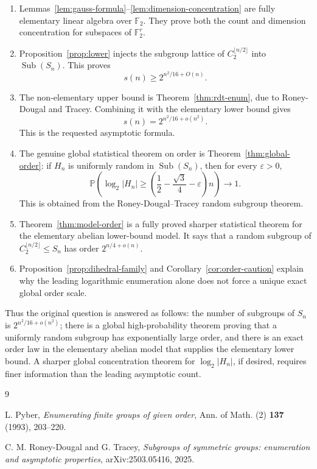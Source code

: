 \documentclass[a4paper,11pt]{amsart}
\theoremstyle{remark}
\newcommand{\Sub}{\operatorname{Sub}}
\newcommand{\F}{\mathbb F}
\newcommand{\Prob}{\mathbb P}
\begin{document}
\begin{enumerate}[label=\textup{(\arabic*)},leftmargin=2.5em]
    \item Lemmas~\ref{lem:gauss-formula}--\ref{lem:dimension-concentration} are fully elementary
    linear algebra over \(\F_2\). They prove both the count and dimension concentration for
    subspaces of \(\F_2^r\).

    \item Proposition~\ref{prop:lower} injects the subgroup lattice of
    \(C_2^{\lfloor n/2\rfloor}\) into \(\Sub(S_n)\). This proves
    \[
            s(n)\geq 2^{n^2/16+O(n)}.
    \]

    \item The non-elementary upper bound is Theorem~\ref{thm:rdt-enum}, due to Roney-Dougal and
    Tracey. Combining it with the elementary lower bound gives
    \[
            s(n)=2^{n^2/16+o(n^2)}.
    \]
    This is the requested asymptotic formula.

    \item The genuine global statistical theorem on order is Theorem~\ref{thm:global-order}: if
    \(H_n\) is uniformly random in \(\Sub(S_n)\), then for every \(\varepsilon>0\),
    \[
            \Prob\left(\log_2|H_n|\geq
            \left(\frac12-\frac{\sqrt3}{4}-\varepsilon\right)n\right)\to 1.
    \]
    This is obtained from the Roney-Dougal--Tracey random subgroup theorem.

    \item Theorem~\ref{thm:model-order} is a fully proved sharper statistical theorem for the
    elementary abelian lower-bound model. It says that a random subgroup of
    \(C_2^{\lfloor n/2\rfloor}\leq S_n\) has order \(2^{n/4+o(n)}\).

    \item Proposition~\ref{prop:dihedral-family} and Corollary~\ref{cor:order-caution} explain why
    the leading logarithmic enumeration alone does not force a unique exact global order scale.
\end{enumerate}

Thus the original question is answered as follows: the number of subgroups of \(S_n\) is
\(2^{n^2/16+o(n^2)}\); there is a global high-probability theorem proving that a uniformly random
subgroup has exponentially large order, and there is an exact order law in the elementary abelian
model that supplies the elementary lower bound. A sharper global concentration theorem for
\(\log_2|H_n|\), if desired, requires finer information than the leading asymptotic count.

\begin{thebibliography}{9}

L. Pyber,
\emph{Enumerating finite groups of given order},
Ann. of Math. (2) \textbf{137} (1993), 203--220.

C. M. Roney-Dougal and G. Tracey,
\emph{Subgroups of symmetric groups: enumeration and asymptotic properties},
arXiv:2503.05416, 2025.

\end{thebibliography}
\end{document}
